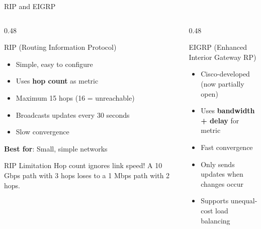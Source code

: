 \documentclass[aspectratio=169]{beamer}  %
\begin{document}
\begin{frame}{RIP and EIGRP}
    \begin{columns}[T]
        \begin{column}{0.48\textwidth}
            \begin{block}{RIP (Routing Information Protocol)}
                \small
                \begin{itemize}\setlength{\itemsep}{2pt}
                    \item Simple, easy to configure
                    \item Uses \textbf{hop count} as metric
                    \item Maximum 15 hops (16 = unreachable)
                    \item Broadcasts updates every 30 seconds
                    \item Slow convergence
                \end{itemize}
                
                \vspace{0.2em}
                \textbf{Best for}: Small, simple networks
            \end{block}
            
            \vspace{0.2em}
            \begin{alertblock}{RIP Limitation}
                \small
                Hop count ignores link speed! A 10 Gbps path with 3 hops loses to a 1 Mbps path with 2 hops.
            \end{alertblock}
        \end{column}
        \begin{column}{0.48\textwidth}
            \begin{block}{EIGRP (Enhanced Interior Gateway RP)}
                \small
                \begin{itemize}\setlength{\itemsep}{2pt}
                    \item Cisco-developed (now partially open)
                    \item Uses \textbf{bandwidth + delay} for metric
                    \item Fast convergence
                    \item Only sends updates when changes occur
                    \item Supports unequal-cost load balancing
                \end{itemize}
                

\end{block}
\end{column}
\end{columns}
\end{frame}
\end{document}
